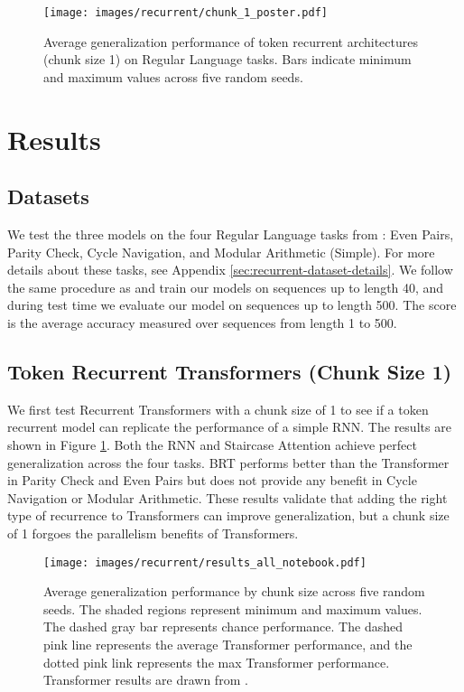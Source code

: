     \begin{figure}[t]
        \centering
        \texttt{[image: images/recurrent/chunk\_1\_poster.pdf]}
        \caption{Average generalization performance of token recurrent architectures (chunk size 1) on Regular Language tasks. Bars indicate minimum and maximum values across five random seeds.}
        \label{fig:fully-recurrent}
    \end{figure}
    
    \section{Results}
    \subsection{Datasets}
    We test the three models on the four Regular Language tasks from \citet{deletang_neural_2022}: Even Pairs, Parity Check, Cycle Navigation, and Modular Arithmetic (Simple). For more details about these tasks, see Appendix \ref{sec:recurrent-dataset-details}. We follow the same procedure as \citet{deletang_neural_2022} and train our models on sequences up to length 40, and during test time we evaluate our model on sequences up to length 500. The score is the average accuracy measured over sequences from length 1 to 500.
    
    \subsection{Token Recurrent Transformers (Chunk Size 1)}
    We first test Recurrent Transformers with a chunk size of 1 to see if a token recurrent model can replicate the performance of a simple RNN. The results are shown in Figure \ref{fig:fully-recurrent}. Both the RNN and Staircase Attention achieve perfect generalization across the four tasks. BRT performs better than the Transformer in Parity Check and Even Pairs but does not provide any benefit in Cycle Navigation or Modular Arithmetic. These results validate that adding the right type of recurrence to Transformers can improve generalization, but a chunk size of 1 forgoes the parallelism benefits of Transformers.
    
    \begin{figure}
        \centering
        \texttt{[image: images/recurrent/results\_all\_notebook.pdf]}
        \caption{Average generalization performance by chunk size across five random seeds. The shaded regions represent minimum and maximum values. The dashed gray bar represents chance performance. The dashed pink line represents the average Transformer performance, and the dotted pink link represents the max Transformer performance. Transformer results are drawn from \citet{deletang_neural_2022}.}
        \label{fig:results}
    \end{figure}
    
